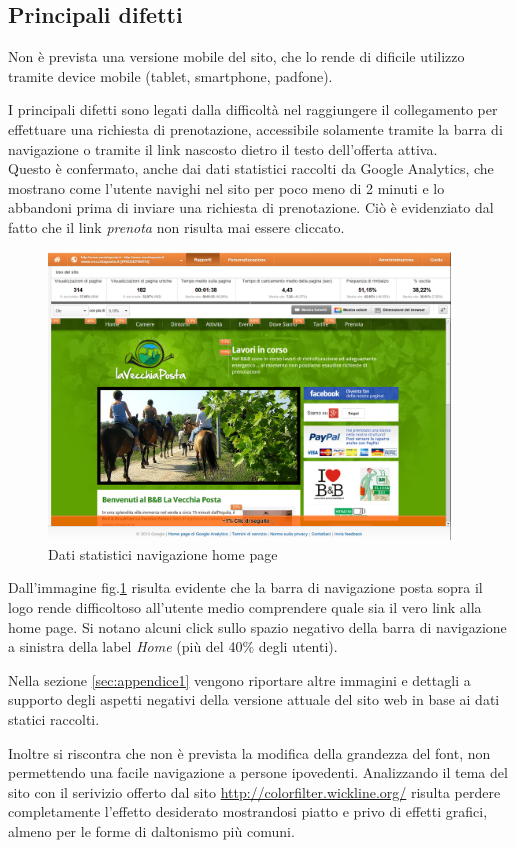 \documentclass[a4paper,12pt,hidelinks]{report}
\begin{document}
\subsection{Principali difetti} 
\label{subsec:difetti}
  Non è prevista una versione mobile del sito, che lo rende di dificile utilizzo tramite device mobile (tablet, smartphone, padfone).
  \par I principali difetti sono legati dalla difficoltà nel raggiungere il collegamento per effettuare una richiesta di prenotazione, accessibile 
  solamente tramite la barra di navigazione o tramite il link nascosto dietro il testo dell'offerta attiva.
  \\ Questo è confermato, anche dai dati statistici raccolti da Google Analytics, che mostrano come l'utente navighi nel sito per poco meno di 2 minuti e 
  lo abbandoni prima di inviare una richiesta di prenotazione. Ciò è evidenziato dal fatto che il link \textit{prenota} non risulta mai essere cliccato.
  \begin{figure}[h!]%
    \includegraphics[width=0.95\textwidth,keepaspectratio=true]{../img/googleAnalyticsDoc1}
    \centering
    \caption{Dati statistici navigazione home page}%
    \label{fig:googleHomePage}%
  \end{figure}
  \par Dall'immagine fig.\ref{fig:googleHomePage} risulta evidente che la barra di navigazione posta sopra il logo rende difficoltoso all'utente medio comprendere 
  quale sia il vero link alla home page. Si notano alcuni click sullo spazio negativo della barra di navigazione a sinistra della label \textit{Home}
  (più del 40\% degli utenti).
  \par Nella sezione \ref{sec:appendice1} vengono riportare altre immagini e dettagli a supporto degli aspetti negativi della versione attuale 
  del sito web in base ai dati statici raccolti.
  \par Inoltre si riscontra che non è prevista la modifica della grandezza del font, non permettendo una facile navigazione a persone ipovedenti. 
  Analizzando il tema del sito con il serivizio offerto dal sito \url{http://colorfilter.wickline.org/} risulta perdere completamente l'effetto desiderato mostrandosi piatto 
  e privo di effetti grafici, almeno per le forme di daltonismo più comuni.
\end{document}
